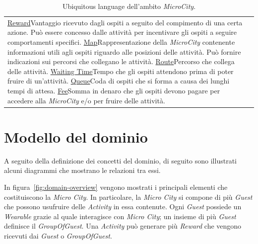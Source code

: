 \begin{table}[H]
\begin{tabular}{|l|p{}|}
        \ul{Reward}{Vantaggio ricevuto dagli ospiti a seguito del compimento di una certa azione. Può essere concesso dalle attività per incentivare gli ospiti a seguire comportamenti specifici.}
        \ul{Map}{Rappresentazione della \textit{MicroCity} contenente informazioni utili agli ospiti riguardo alle posizioni delle attività. Può fornire indicazioni sui percorsi che collegano le attività.}
        \ul{Route}{Percorso che collega delle attività.}
        \ul{Waiting Time}{Tempo che gli ospiti attendono prima di poter fruire di un'attività.}
        \ul{Queue}{Coda di ospiti che si forma a causa dei lunghi tempi di attesa.}
        \ul{Fee}{Somma in denaro che gli ospiti devono pagare per accedere alla \textit{MicroCity} e/o per fruire delle attività.}
    \end{tabular}
    \caption{Ubiquitous language dell'ambito \textit{MicroCity}.}
    \label{tab:ul}
\end{table}

\section{Modello del dominio}\label{sec:modello-del-dominio}

A seguito della definizione dei concetti del dominio, di seguito sono illustrati alcuni diagrammi che mostrano le relazioni
tra essi.

In figura~\ref{fig:domain-overview} vengono mostrati i principali elementi che costituiscono la \textit{Micro City}.
In particolare, la \textit{Micro City} si compone di più \textit{Guest} che possono usufruire delle \textit{Activity} in essa
contenute.
Ogni \textit{Guest} possiede un \textit{Wearable} grazie al quale interagisce con \textit{Micro City}; un insieme di
più \textit{Guest} definisce il \textit{GroupOfGuest}.
Una \textit{Activity} può generare più \textit{Reward} che vengono ricevuti dai \textit{Guest} o \textit{GroupOfGuest}.


